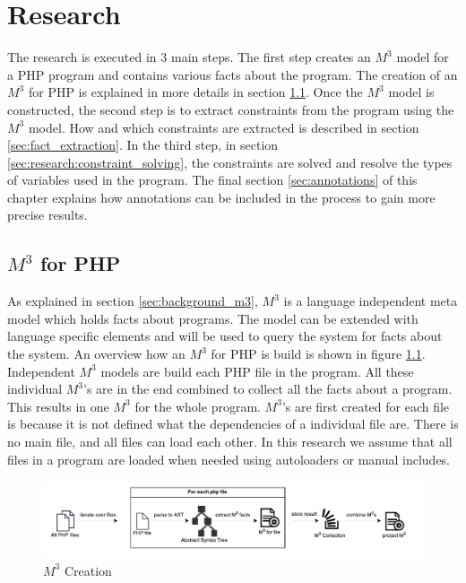 \documentclass[../main.tex]{subfiles}
\begin{document}
    \chapter{Research}\label{ch:research}

    The research is executed in 3 main steps.
    The first step creates an $M^3$ model for a PHP program and contains various facts about the program. 
    The creation of an $M^3$ for PHP is explained in more details in section \ref{sec:m3_for_php}.
    Once the $M^3$ model is constructed, the second step is to extract constraints from the program using the $M^3$ model. How and which constraints are extracted is described in section \ref{sec:fact_extraction}.
    In the third step, in section \ref{sec:research:constraint_solving}, the constraints are solved and resolve the types of variables used in the program.
    The final section \ref{sec:annotations} of this chapter explains how annotations can be included in the process to gain more precise results.
    
    \section{$M^3$ for PHP}\label{sec:m3_for_php}
    As explained in section \ref{sec:background_m3}, $M^3$ is a language independent meta model which holds facts about programs.
    The model can be extended with language specific elements and will be used to query the system for facts about the system.
    An overview how an $M^3$ for PHP is build is shown in figure \ref{fig:research_m3_creation}.
    Independent $M^3$ models are build each PHP file in the program.
    All these individual $M^3$'s are in the end combined to collect all the facts about a program.
    This results in one $M^3$ for the whole program.
    $M^3$'s are first created for each file is because it is not defined what the dependencies of a individual file are.
    There is no main file, and all files can load each other.
    In this research we assume that all files in a program are loaded when needed using autoloaders or manual includes.
    
    \begin{figure}[H]
        \centerline{\includegraphics{Diagrams/M3Creation.pdf}}
        \caption{$M^3$ Creation}
        \label{fig:research_m3_creation}
    \end{figure}
\end{document}

